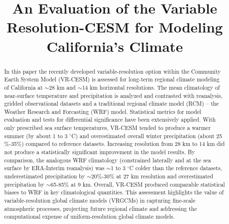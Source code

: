 \documentclass[draft,ms]{agutex}   %
\begin{document}
%
%


\title{An Evaluation of the Variable Resolution-CESM for Modeling California's Climate}




%

\begin{abstract}

In this paper the recently developed variable-resolution option within the Community Earth System Model (VR-CESM) is assessed for long-term regional climate modeling of California at $\sim$28 km and $\sim$14 km horizontal resolutions. The mean climatology of near-surface temperature and precipitation is analyzed and contrasted with reanalysis, gridded observational datasets and a traditional regional climate model (RCM) -- the Weather Research and Forcasting (WRF) model. Statistical metrics for model evaluation and tests for differential significance have been extensively applied. With only prescribed sea surface temperatures, VR-CESM tended to produce a warmer summer (by about 1 to 3 $^\circ$C) and overestimated overall winter precipitation (about 25$\%$-35$\%$) compared to reference datasets. Increasing resolution from 28 km to 14 km did not produce a statistically significant improvement in the model results. By comparison, the analogous WRF climatology (constrained laterally and at the sea surface by ERA-Interim reanalysis) was $\sim$1 to 3 $^\circ$C colder than the reference datasets, underestimated precipitation by $\sim$20$\%$-30$\%$ at 27 km resolution and overestimated precipitation by $\sim$65-85$\%$ at 9 km.  Overall, VR-CESM produced comparable statistical biases to WRF in key climatological quantities.  This assessment highlights the value of variable-resolution global climate models (VRGCMs) in capturing fine-scale atmospheric processes, projecting future regional climate and addressing the computational expense of uniform-resolution global climate models.

\end{abstract} 
\end{document}
